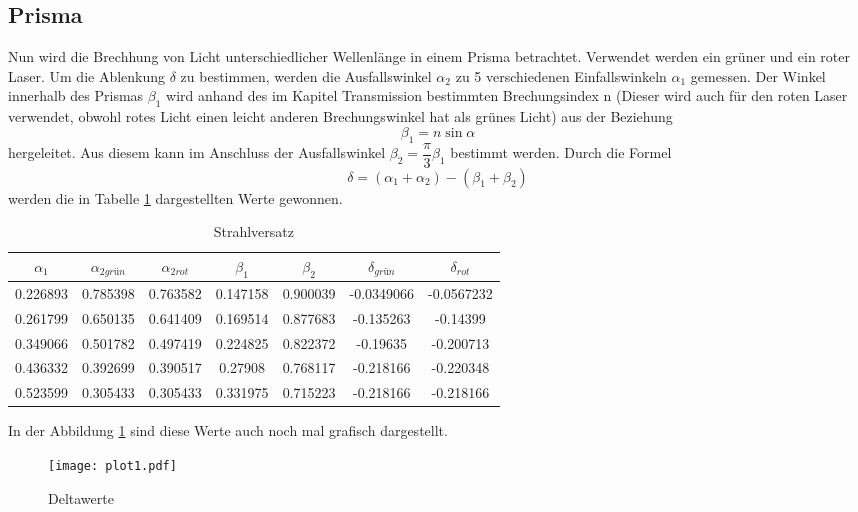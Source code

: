 \subsection{Prisma}
  Nun wird die Brechhung von Licht unterschiedlicher Wellenlänge in einem Prisma betrachtet.
  Verwendet werden ein grüner und ein roter Laser. Um die Ablenkung $\delta$ zu bestimmen,
  werden die Ausfallswinkel $\alpha_2$ zu 5 verschiedenen Einfallswinkeln $\alpha_1$ gemessen.
  Der Winkel innerhalb des Prismas $\beta_1$ wird anhand des im Kapitel Transmission bestimmten 
  Brechungsindex n (Dieser wird auch für den roten Laser verwendet, obwohl rotes Licht einen
  leicht anderen Brechungswinkel hat als grünes Licht) aus der Beziehung 
  \begin{equation*}
    \beta_1=n\sin{\alpha}
  \end{equation*}
  hergeleitet. Aus diesem kann im Anschluss der Ausfallswinkel $\beta_2=\dfrac{\pi}{3}\beta_1$
  bestimmt werden. 
  Durch die Formel
  \begin{equation*}
    \delta = (\alpha_1+\alpha_2)-(\beta_1+\beta_2)
  \end{equation*}
  werden die in Tabelle \ref{tab:strahlv} dargestellten Werte gewonnen.
  \begin{table}[H]
    \centering
    \caption{Strahlversatz}
    \begin{tabular}{c c c c c c c}
      \toprule
      $\alpha_1$ & $\alpha_{2grün} $  & $\alpha_{2rot}$ & $\beta_1$ & $\beta_2$ & $\delta_{grün}$& $\delta_{rot}$\\
      \midrule
      0.226893 & 0.785398 & 0.763582 & 0.147158 & 0.900039 & -0.0349066 & -0.0567232 \\
      0.261799 & 0.650135 & 0.641409 & 0.169514 & 0.877683 & -0.135263  & -0.14399   \\
      0.349066 & 0.501782 & 0.497419 & 0.224825 & 0.822372 & -0.19635   & -0.200713  \\
      0.436332 & 0.392699 & 0.390517 & 0.27908  & 0.768117 & -0.218166  & -0.220348  \\
      0.523599 & 0.305433 & 0.305433 & 0.331975 & 0.715223 & -0.218166  & -0.218166  \\
      \bottomrule
    \end{tabular}
    \label{tab:strahlv}
  \end{table}
  In der Abbildung \ref{fig:plot} sind diese Werte auch noch mal grafisch dargestellt.
  \begin{figure}[H]
    \centering
    \texttt{[image: plot1.pdf]}
    \caption{Deltawerte}
    \label{fig:plot}
  \end{figure}

